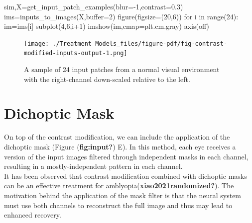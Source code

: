 \documentclass[
  letterpaper,
]{book}
\newenvironment{Shaded}{\begin{snugshade}}{\end{snugshade}}
\newcommand{\BuiltInTok}[1]{\textcolor[rgb]{0.00,0.23,0.31}{#1}}
\newcommand{\ControlFlowTok}[1]{\textcolor[rgb]{0.00,0.23,0.31}{#1}}
\newcommand{\DecValTok}[1]{\textcolor[rgb]{0.68,0.00,0.00}{#1}}
\newcommand{\FloatTok}[1]{\textcolor[rgb]{0.68,0.00,0.00}{#1}}
\newcommand{\KeywordTok}[1]{\textcolor[rgb]{0.00,0.23,0.31}{#1}}
\newcommand{\NormalTok}[1]{\textcolor[rgb]{0.00,0.23,0.31}{#1}}
\newcommand{\OperatorTok}[1]{\textcolor[rgb]{0.37,0.37,0.37}{#1}}
\newcommand{\StringTok}[1]{\textcolor[rgb]{0.13,0.47,0.30}{#1}}
\begin{document}
\begin{Shaded}
\begin{Highlighting}[]
\NormalTok{sim,X}\OperatorTok{=}\NormalTok{get\_input\_patch\_examples(blur}\OperatorTok{={-}}\DecValTok{1}\NormalTok{,contrast}\OperatorTok{=}\FloatTok{0.3}\NormalTok{)}
\NormalTok{ims}\OperatorTok{=}\NormalTok{inputs\_to\_images(X,}\BuiltInTok{buffer}\OperatorTok{=}\DecValTok{2}\NormalTok{)}
\NormalTok{figure(figsize}\OperatorTok{=}\NormalTok{(}\DecValTok{20}\NormalTok{,}\DecValTok{6}\NormalTok{))}
\ControlFlowTok{for}\NormalTok{ i }\KeywordTok{in} \BuiltInTok{range}\NormalTok{(}\DecValTok{24}\NormalTok{):}
\NormalTok{    im}\OperatorTok{=}\NormalTok{ims[i]}
\NormalTok{    subplot(}\DecValTok{4}\NormalTok{,}\DecValTok{6}\NormalTok{,i}\OperatorTok{+}\DecValTok{1}\NormalTok{)}
\NormalTok{    imshow(im,cmap}\OperatorTok{=}\NormalTok{plt.cm.gray)}
\NormalTok{    axis(}\StringTok{\textquotesingle{}off\textquotesingle{}}\NormalTok{)}
    
\end{Highlighting}
\end{Shaded}

\begin{figure}[H]

{\centering \texttt{[image: ./Treatment Models\_files/figure-pdf/fig-contrast-modified-inputs-output-1.png]}

}

\caption{\label{fig-contrast-modified-inputs}A sample of 24 input
patches from a normal visual environment with the right-channel
down-scaled relative to the left.}

\end{figure}

\hypertarget{dichoptic-mask}{%
\section{Dichoptic Mask}\label{dichoptic-mask}}

On top of the contrast modification, we can include the application of
the dichoptic mask (Figure (\textbf{fig:input?}) E). In this method,
each eye receives a version of the input images filtered through
independent masks in each channel, resulting in a mostly-independent
pattern in each channel.\\
It has been observed that contrast modification combined with dichoptic
masks can be an effective treatment for
amblyopia(\textbf{xiao2021randomized?}). The motivation behind the
application of the mask filter is that the neural system must use both
channels to reconstruct the full image and thus may lead to enhanced
recovery.
\end{document}
